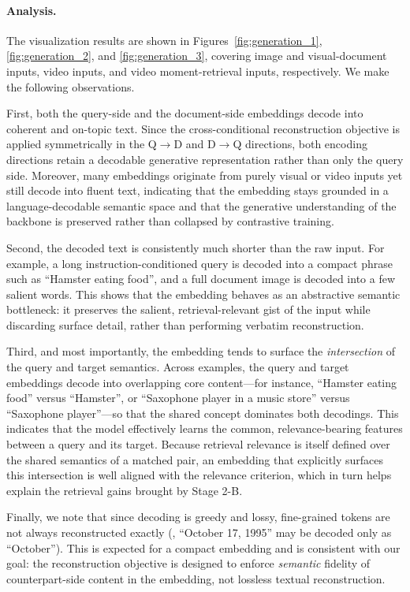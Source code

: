 \paragraph{Analysis.}
The visualization results are shown in Figures~\ref{fig:generation_1}, \ref{fig:generation_2}, and \ref{fig:generation_3}, covering image and visual-document inputs, video inputs, and video moment-retrieval inputs, respectively. We make the following observations.

First, both the query-side and the document-side embeddings decode into coherent and on-topic text. Since the cross-conditional reconstruction objective is applied symmetrically in the Q$\rightarrow$D and D$\rightarrow$Q directions, both encoding directions retain a decodable generative representation rather than only the query side. Moreover, many embeddings originate from purely visual or video inputs yet still decode into fluent text, indicating that the embedding stays grounded in a language-decodable semantic space and that the generative understanding of the backbone is preserved rather than collapsed by contrastive training.

Second, the decoded text is consistently much shorter than the raw input. For example, a long instruction-conditioned query is decoded into a compact phrase such as ``Hamster eating food'', and a full document image is decoded into a few salient words. This shows that the embedding behaves as an abstractive semantic bottleneck: it preserves the salient, retrieval-relevant gist of the input while discarding surface detail, rather than performing verbatim reconstruction.

Third, and most importantly, the embedding tends to surface the \emph{intersection} of the query and target semantics. Across examples, the query and target embeddings decode into overlapping core content---for instance, ``Hamster eating food'' versus ``Hamster'', or ``Saxophone player in a music store'' versus ``Saxophone player''---so that the shared concept dominates both decodings. This indicates that the model effectively learns the common, relevance-bearing features between a query and its target. Because retrieval relevance is itself defined over the shared semantics of a matched pair, an embedding that explicitly surfaces this intersection is well aligned with the relevance criterion, which in turn helps explain the retrieval gains brought by Stage 2-B.

Finally, we note that since decoding is greedy and lossy, fine-grained tokens are not always reconstructed exactly (\eg, ``October 17, 1995'' may be decoded only as ``October''). This is expected for a compact embedding and is consistent with our goal: the reconstruction objective is designed to enforce \emph{semantic} fidelity of counterpart-side content in the embedding, not lossless textual reconstruction.

